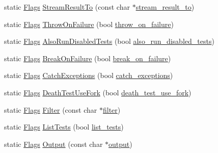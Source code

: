 \begin{DoxyCompactItemize}
\item 
static \mbox{\hyperlink{structtesting_1_1_flags}{Flags}} \mbox{\hyperlink{structtesting_1_1_flags_a9cf0f64310b28eadbbfbb35584ebfc71}{Stream\+Result\+To}} (const char $\ast$\mbox{\hyperlink{structtesting_1_1_flags_a2adb495720379293f7e3fa0148482ac9}{stream\+\_\+result\+\_\+to}})
\item 
static \mbox{\hyperlink{structtesting_1_1_flags}{Flags}} \mbox{\hyperlink{structtesting_1_1_flags_ad856df862414ed0dadf80b5e03829cc7}{Throw\+On\+Failure}} (bool \mbox{\hyperlink{structtesting_1_1_flags_ab8e7d21e31e641efe47b8050759e001a}{throw\+\_\+on\+\_\+failure}})
\item 
static \mbox{\hyperlink{structtesting_1_1_flags}{Flags}} \mbox{\hyperlink{structtesting_1_1_flags_a8bee2b5f94d8248b6791d6b005db146f}{Also\+Run\+Disabled\+Tests}} (bool \mbox{\hyperlink{structtesting_1_1_flags_a8ebf8c68f918b9039926b569c880f910}{also\+\_\+run\+\_\+disabled\+\_\+tests}})
\item 
static \mbox{\hyperlink{structtesting_1_1_flags}{Flags}} \mbox{\hyperlink{structtesting_1_1_flags_a62660e44922321f7640bc951a04c2296}{Break\+On\+Failure}} (bool \mbox{\hyperlink{structtesting_1_1_flags_acccce2a9673bb61751269d2ef9c21c89}{break\+\_\+on\+\_\+failure}})
\item 
static \mbox{\hyperlink{structtesting_1_1_flags}{Flags}} \mbox{\hyperlink{structtesting_1_1_flags_a2c7d89f62f4328ae0ced66154ef96b44}{Catch\+Exceptions}} (bool \mbox{\hyperlink{structtesting_1_1_flags_a06984d0553f09716e1bd9f159e7cc644}{catch\+\_\+exceptions}})
\item 
static \mbox{\hyperlink{structtesting_1_1_flags}{Flags}} \mbox{\hyperlink{structtesting_1_1_flags_a4468e5625833043596c44be174349d8c}{Death\+Test\+Use\+Fork}} (bool \mbox{\hyperlink{structtesting_1_1_flags_a7cdef4e6e102771fc15940931dd07e5c}{death\+\_\+test\+\_\+use\+\_\+fork}})
\item 
static \mbox{\hyperlink{structtesting_1_1_flags}{Flags}} \mbox{\hyperlink{structtesting_1_1_flags_afc7350b7c1ac4c0e0efe2d9a94729eb7}{Filter}} (const char $\ast$\mbox{\hyperlink{structtesting_1_1_flags_ae9ab05193291ed87627adaceef9d1279}{filter}})
\item 
static \mbox{\hyperlink{structtesting_1_1_flags}{Flags}} \mbox{\hyperlink{structtesting_1_1_flags_a825a5d763a31fe6c28f543990bd336df}{List\+Tests}} (bool \mbox{\hyperlink{structtesting_1_1_flags_a3c73f29131074146224018066379fb2f}{list\+\_\+tests}})
\item 
static \mbox{\hyperlink{structtesting_1_1_flags}{Flags}} \mbox{\hyperlink{structtesting_1_1_flags_a507916734a6d7ff2dd02891d7849f2d3}{Output}} (const char $\ast$\mbox{\hyperlink{structtesting_1_1_flags_ab8f863c8ba22841c9b1b48af7f01dfa7}{output}})

\end{DoxyCompactItemize}
